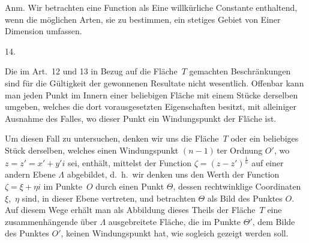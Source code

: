 \documentclass[a4paper,12pt]{article}
\begin{document}
\medskip

{\footnotesize
Anm.  Wir  betrachten eine Function als Eine willk\"{u}rliche
Constante enthaltend, wenn die m\"{o}glichen Arten, sie zu
bestimmen, ein stetiges Gebiet von Einer Dimension umfassen.\par}

\medbreak

\centerline{14.}

\nobreak\medskip

Die im Art.~12 und 13 in Bezug auf die Fl\"{a}che~$T$ gemachten
Beschr\"{a}nkungen sind f\"{u}r die G\"{u}ltigkeit der gewonnenen
Resultate nicht wesentlich.  Offenbar kann man jeden Punkt im
Innern einer beliebigen Fl\"{a}che mit einem St\"{u}cke derselben
umgeben, welches die dort vorausgesetzten Eigenschaften besitzt,
mit alleiniger Ausnahme des Falles, wo dieser Punkt ein
Windungspunkt der Fl\"{a}che ist.

Um diesen Fall zu untersuchen, denken wir uns die Fl\"{a}che~$T$
oder ein beliebiges St\"{u}ck derselben, welches einen
Windungspunkt $(n - 1) \,$\-ter Ordnung $O'$, wo $z = z' = x' + y' i$
sei, enth\"{a}lt, mittelst der Function
$\displaystyle \zeta = (z - z')^{\frac{1}{n}}$
auf einer andern Ebene $\Lambda$ abgebildet, d.~h.\ wir denken
uns den Werth der Function $\zeta = \xi + \eta i$ im Punkte~$O$
durch einen Punkt $\Theta$, dessen rechtwinklige Coordinaten
$\xi$,~$\eta$ sind, in dieser Ebene vertreten, und betrachten
$\Theta$ als Bild des Punktes $O$.  Auf diesem Wege erh\"{a}lt
man als Abbildung dieses Theils der Fl\"{a}che~$T$ eine
zusammenh\"{a}ngende \"{u}ber $\Lambda$ ausgebreitete Fl\"{a}che,
die im Punkte $\Theta'$, dem Bilde des Punktes $O'$, keinen
Windungspunkt hat, wie sogleich gezeigt werden soll.
\end{document}
